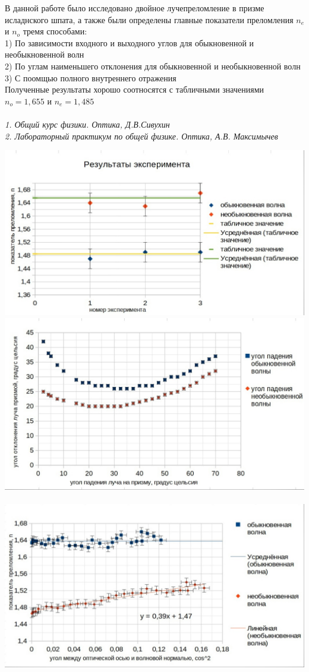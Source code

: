 \documentclass[a4paper]{article}
\begin{document}
\begin{multicols}{2}
\begin{enumerate}
В данной работе было исследовано двойное лучепреломление в призме исладнского шпата, а также были определены главные показатели преломления $n_e$ и $n_o$ тремя способами:\\
1) По зависимости входного и выходного углов для обыкновенной и необыкновенной волн\\
2) По углам наименьшего отклонения для обыкновенной и необыкновенной волн\\
3) С поомщью полного внутреннего отражения\\
 Полученные результаты хорошо соотносятся с табличными значениями $n_o = 1,655$ и $n_e = 1,485$\\
 \\
\textit{1. Общий курс физики. Оптика, Д.В.Сивухин}\\
\textit{2. Лабораторный практикум по общей физике. Оптика, А.В. Максимычев}\\
 \end{enumerate}
\end{multicols}
 \includegraphics[width = 18cm]{g3}\\
\includegraphics[width=18cm]{g11}\\
\\
\includegraphics[width=18cm]{g22}\\
\end{document}
